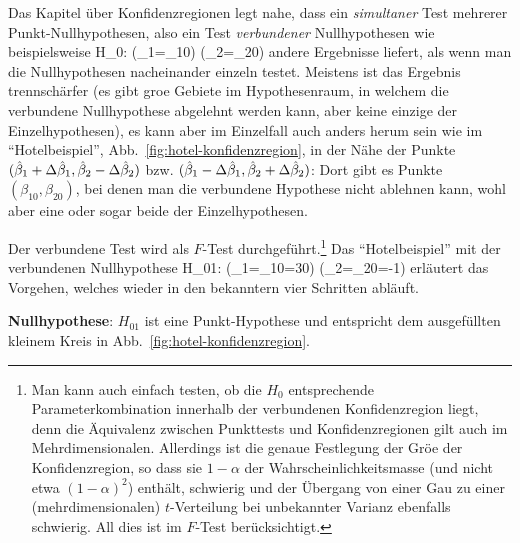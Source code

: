 Das Kapitel \"uber Konfidenzregionen legt nahe, dass ein
\emph{simultaner} Test mehrerer Punkt-Nullhypothesen, also ein Test
\emph{verbundener} Nullhypothesen wie beispielsweise
\bdm
H_0: (\beta_1=\beta_{10}) \cap (\beta_2=\beta_{20})
\edm
andere Ergebnisse liefert, als wenn man die Nullhypothesen
nacheinander einzeln testet. Meistens ist das Ergebnis trennsch\"arfer
(es gibt gro\3e Gebiete im Hypothesenraum, in welchem die 
verbundene Nullhypothese abgelehnt werden kann, aber keine
einzige der Einzelhypothesen), es kann aber im Einzelfall auch anders
herum sein wie im ``Hotelbeispiel'',
Abb.~\ref{fig:hotel-konfidenzregion}, in der N\"ahe der Punkte  
$(\hat{\beta}_1+\Delta\hat{\beta}_1, \hat{\beta}_2-\Delta\hat{\beta}_2)$
bzw.
$(\hat{\beta}_1-\Delta\hat{\beta}_1, \hat{\beta}_2+\Delta\hat{\beta}_2)$: Dort
gibt es Punkte $(\beta_{10}, \beta_{20})$, bei denen 
man die verbundene Hypothese nicht ablehnen kann, wohl aber eine oder
sogar beide der Einzelhypothesen.

Der verbundene Test wird als $F$-Test durchgef\"uhrt.\footnote{Man
kann auch einfach testen, ob die $H_0$ entsprechende
Parameterkombination innerhalb der verbundenen Konfidenzregion liegt,
denn die \"Aquivalenz zwischen Punkttests und Konfidenzregionen gilt
auch im Mehrdimensionalen. Allerdings ist die genaue Festlegung der
Gr\"o\3e der Konfidenzregion, so dass sie $1-\alpha$ der
Wahrscheinlichkeitsmasse (und nicht etwa $(1-\alpha)^2$) enth\"alt, 
schwierig und der \"Ubergang von
einer Gau\3 zu einer (mehrdimensionalen) $t$-Verteilung bei
unbekannter Varianz ebenfalls schwierig. All dies ist im $F$-Test
ber\"ucksichtigt.}
Das ``Hotelbeispiel'' mit der verbundenen Nullhypothese
\bdm
H_{01}: (\beta_1=\beta_{10}=30) \cap (\beta_2=\beta_{20}=-1)
\edm
erl\"autert das Vorgehen, welches wieder in den bekanntern vier
Schritten abl\"auft.
\benum
\item \textbf{Nullhypothese}: $H_{01}$ ist eine Punkt-Hypothese und
  entspricht dem ausgef\"ullten kleinem Kreis in
  Abb.~\ref{fig:hotel-konfidenzregion}.

